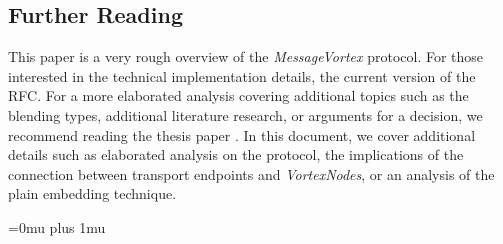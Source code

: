 \documentclass[acmsmall, screen, review]{acmart}
\begin{document}
	\subsection{Further Reading}
	This paper is a very rough overview of the \emph{MessageVortex} protocol. For those interested in the technical implementation details, the current version of the RFC\cite{MessageVortexRFC}. For a more elaborated analysis covering additional topics such as the blending types, additional literature research, or arguments for a decision, we recommend reading the thesis paper \cite{messageVortex}. In this document, we cover additional details such as elaborated analysis on the protocol, the implications of the connection between transport endpoints and \emph{VortexNodes}, or an analysis of the plain embedding technique.
	
	
	
	\Urlmuskip=0mu plus 1mu %
	
	
\end{document}

